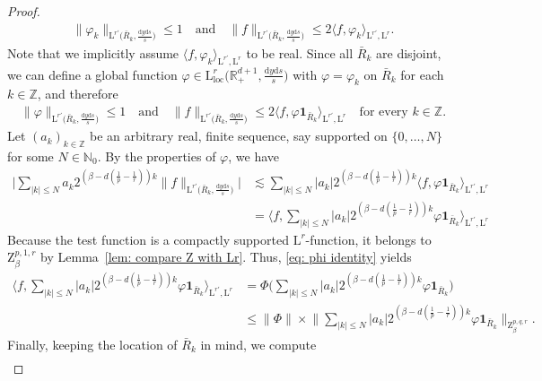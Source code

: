 \documentclass[11pt, leqno,parskip=half]{amsart}
\theoremstyle{definition}
\newcommand{\IR}{\mathbb{R}}
\newcommand{\IN}{\mathbb{N}}
\newcommand{\IZ}{\mathbb{Z}}
\renewcommand{\L}{\mathrm{L}}
\newcommand{\Z}{\mathrm{Z}}
\newcommand{\ind}{{\mathbf{1}}}
\renewcommand{\d}{\mathrm{d}}
\newcommand{\loc}{\mathrm{loc}}
\numberwithin{equation}{section}
\begin{document}
\begin{proof}
    \begin{align*}
        \|\varphi_k\|_{\L^{r'}\big(\bar R_k, \frac{\d y \d s}{s}\big)} \leq 1 \quad \text{and} \quad  \|f\|_{\L^{r'}\big(\bar R_k, \frac{\d y \d s}{s}\big)} \leq 2 \langle f , \varphi_k\rangle_{\L^{r'},\L^{r}}.
    \end{align*}
    Note that we implicitly assume $\langle f , \varphi_k\rangle_{\L^{r'},\L^{r}}$ to be real.
    Since all $\bar R_k$ are disjoint, we can define a global function $\varphi\in \L^{r}_{\loc}\big(\IR^{d+1}_+, \frac{\d y \d s}{s}\big)$ with $\varphi = \varphi_k$ on $\bar R_k$ for each $k\in \IZ$, and therefore
    \begin{align*}
        \|\varphi\|_{\L^{r'}\big(\bar R_k, \frac{\d y \d s}{s}\big)} \leq 1 \quad \text{and} \quad  \|f\|_{\L^{r'}\big(\bar R_k, \frac{\d y \d s}{s}\big)} \leq 2 \langle f , \varphi \ind_{\bar R_k} \rangle_{\L^{r'},\L^{r}} \quad \text{for every $k\in\IZ$.}
    \end{align*}
    Let $(a_k)_{k\in\IZ}$ be an arbitrary real, finite sequence, say supported on $\{ 0, \dots, N \}$ for some $N\in\IN_0$. By the properties of $\varphi$, we have
    \begin{align}
    \label{eq: back to}
        \Big|\sum\limits_{|k|\leq N} a_k2^{(\beta-d(\frac{1}{p}-\frac{1}{r}))k} \|f\|_{\L^{r'}\big(\bar R_k, \frac{\d y \d s}{s}\big)}\big| &\lesssim  \sum\limits_{|k|\leq N} |a_k| 2^{(\beta-d(\frac{1}{p}-\frac{1}{r}))k} \langle f , \varphi \ind_{\bar R_k} \rangle_{\L^{r'},\L^r}\nonumber \\
        &=\langle f , \sum\limits_{|k|\leq N} |a_k| 2^{(\beta-d(\frac{1}{p}-\frac{1}{r}))k}\varphi \ind_{\bar R_k} \rangle_{\L^{r'},\L^r}
    \end{align}
    Because the test function is a compactly supported $\L^{r}$-function, it belongs to $\Z^{p,1,r}_\beta$ by Lemma~\ref{lem: compare Z with Lr}. Thus, \eqref{eq: phi identity} yields
    \begin{align*}
        \langle f , \sum\limits_{|k|\leq N} |a_k|2^{(\beta-d(\frac{1}{p}-\frac{1}{r}))k}\varphi \ind_{\bar R_k} \rangle_{\L^{r'},\L^r} &= \Phi\Big(\sum\limits_{|k|\leq N} |a_k|2^{(\beta-d(\frac{1}{p}-\frac{1}{r}))k}\varphi \ind_{\bar R_k} \Big)\\
        &\leq \|\Phi\|\times \bigg\|\sum\limits_{|k|\leq N} |a_k|2^{(\beta-d(\frac{1}{p}-\frac{1}{r}))k}\varphi \ind_{\bar R_k} \bigg\|_{\Z^{p,q,r}_\beta}.
    \end{align*}
    Finally, keeping the location of $\bar R_k$ in mind, we compute
    \begin{align*}

\end{align*}
\end{proof}
\end{document}
